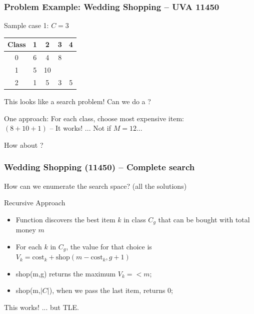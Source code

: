 \documentclass{beamer}
\begin{document}
\begin{frame}
  \frametitle{Problem Example: Wedding Shopping -- UVA 11450}
  \begin{block}{Sample case 1: $C=3$}
  \begin{tabular}{|c|cccc|}
    Class & 1 & 2 & 3 & 4\\
    \hline
    0 & 6 & 4 & 8 & \\
    1 & 5 & 10 & & \\
    2 & 1 & 5 & 3 & 5\\
  \end{tabular}
  \end{block}

  This looks like a search problem! Can we do a ?

  \bigskip

  One approach: For each class, choose most expensive item:\\
  $(8+10+1)$ -- It works! ... Not if $M = 12$...

  \medskip

  How about ?

\end{frame}

\begin{frame}
  \frametitle{Wedding Shopping (11450) -- Complete search}
  How can we enumerate the search space? (all the solutions)

  \begin{block}{Recursive Approach}
    \begin{itemize}
    \item Function  discovers the best item $k$
      in class $C_g$ that can be bought with total money $m$
    \item For each $k$ in $C_g$, the value for that choice is $V_k =
      \text{cost}_k + \text{shop}(m - \text{cost}_k, g+1)$
    \item shop(m,g) returns the maximum $V_k =< m$;
    \item shop(m,$|C|$), when we pass the last item, returns 0;
    \end{itemize}

  \end{block}

  \vfill
  
  This works! ... but TLE.
\end{frame}
\end{document}
